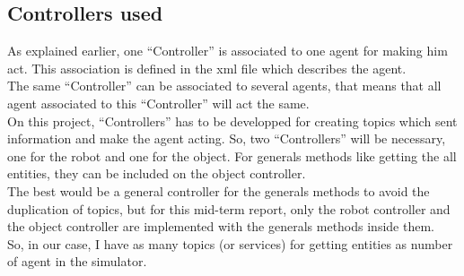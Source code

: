 \noindent\begin{minipage}{\linewidth}%
\label{fig:sig_ros_general}%
\end{minipage}

\subsection{Controllers used}
As explained earlier, one ``Controller'' is associated to one agent for making him act. This association is defined in the xml file which describes the agent.\\
The same ``Controller'' can be associated to several agents, that means that all agent associated to this ``Controller'' will act the same.\\
On this project, ``Controllers'' has to be developped for creating topics which sent information and make the agent acting. So, two ``Controllers'' will be necessary, one for the robot and one for the object. For generals methods like getting the all entities, they can be included on the object controller.\\
The best would be a general controller for the generals methods to avoid the duplication of topics, but for this mid-term report, only the robot controller and the object controller are implemented with the generals methods inside them.\\
So, in our case, I have as many topics (or services) for getting entities as number of agent in the simulator.\\

